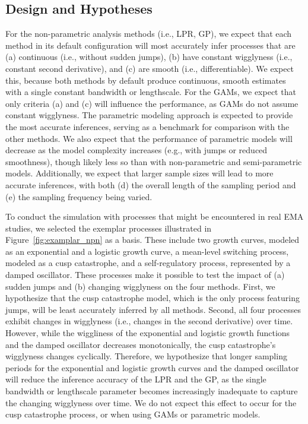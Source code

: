 \documentclass[man, floatsintext]{apa7}
\begin{document}
\subsection{Design and Hypotheses}

For the non-parametric analysis methods (i.e., LPR, GP), we expect that
each method in its default configuration will most accurately infer processes
that are (a) continuous (i.e., without sudden jumps), (b) have constant
wigglyness (i.e., constant second derivative), and (c) are smooth (i.e.,
differentiable). We expect this, because both methods by default
produce
continuous, smooth estimates with a single constant bandwidth or lengthscale.
For the GAMs, we expect that only criteria (a) and (c) will influence
the performance, as GAMs do not assume constant wigglyness. The
parametric modeling approach is expected to provide the most accurate
inferences, serving as a benchmark for comparison with the other methods. We
also expect that the performance of parametric models will decrease as the
model complexity increases (e.g., with jumps or reduced smoothness), though
likely less so than with non-parametric and semi-parametric models.
Additionally, we expect that larger sample sizes will lead to more accurate
inferences, with both (d) the overall length of the sampling period and (e) the
sampling frequency being varied.

To conduct the simulation with processes that might be encountered in real
EMA studies, we selected the exemplar processes illustrated in
Figure~\ref{fig:examplar_npn} as a basis.
These include two growth curves, modeled as an exponential and
a logistic growth curve, a mean-level switching process, modeled as a cusp
catastrophe, and a self-regulatory process, represented by a damped oscillator.
These processes make it possible to test the impact of (a) sudden jumps and
(b) changing wigglyness on the four methods.
First, we hypothesize that the cusp catastrophe model, which is the only
process featuring jumps, will be least accurately inferred by all methods.
Second, all four processes exhibit changes in wigglyness (i.e., changes in the
second derivative) over time. However, while the wiggliness of the exponential
and logistic growth functions and the damped oscillator decreases
monotonically, the cusp catastrophe's wigglyness changes cyclically.
Therefore, we hypothesize that longer sampling periods for the exponential and
logistic
growth curves and the damped oscillator will reduce the inference accuracy of
the LPR and the GP, as the single bandwidth or lengthscale
parameter becomes increasingly inadequate to capture the changing
wigglyness over time. We do not expect this effect to occur for the cusp
catastrophe process, or when using GAMs or parametric models.
\end{document}
